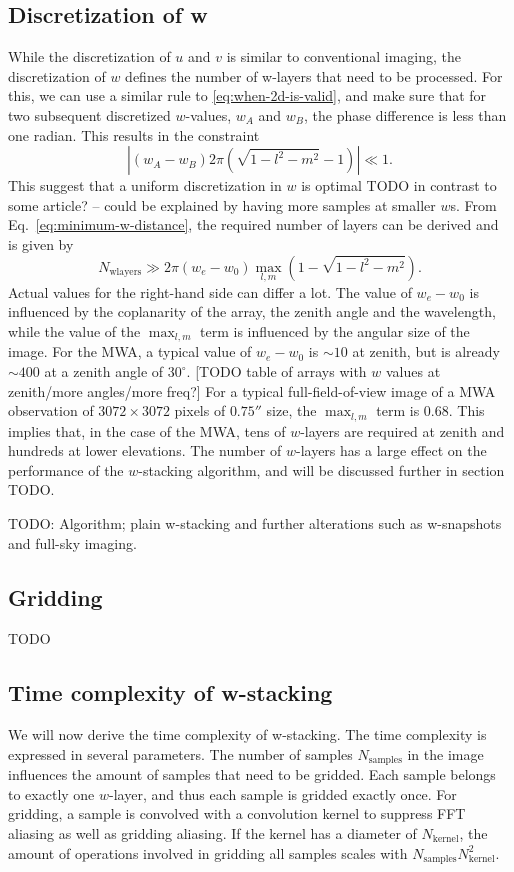 \documentclass[useAMS,usenatbib]{mn2e}
\begin{document}
\subsection{Discretization of w} \label{sec:gridding-w}
While the discretization of $u$ and $v$ is similar to conventional imaging, the discretization of $w$ defines the number of w-layers that need to be processed. For this, we can use a similar rule to \eqref{eq:when-2d-is-valid}, and make sure that for two subsequent discretized $w$-values, $w_A$ and $w_B$, the phase difference is less than one radian. This results in the constraint
\begin{equation} \label{eq:minimum-w-distance}
\left|\left(w_A - w_B\right) 2\pi (\sqrt{1-l^2-m^2}-1)\right| \ll 1.
\end{equation}
This suggest that a uniform discretization in $w$ is optimal TODO in contrast to some article? -- could be explained by having more samples at smaller $w$s. From Eq.~\eqref{eq:minimum-w-distance}, the required number of layers can be derived and is given by
\begin{equation}
 N_\textrm{wlayers} \gg 2\pi \left(w_e - w_0\right) \max_{l,m} \left(1 - \sqrt{1-l^2-m^2}\right).
\end{equation}
Actual values for the right-hand side can differ a lot. The value of $w_e - w_0$ is influenced by the coplanarity of the array, the zenith angle and the wavelength, while the value of the $\max_{l,m}$ term is influenced by the angular size of the image. For the MWA, a typical value of $w_e - w_0$ is $\sim 10$ at zenith, but is already $\sim 400$ at a zenith angle of $30^{\circ}$. [TODO table of arrays with $w$ values at zenith/more angles/more freq?] For a typical full-field-of-view image of a MWA observation of $3072\times 3072$ pixels of $0.75''$ size, the $\max_{l,m}$ term is $0.68$. This implies that, in the case of the MWA, tens of $w$-layers are required at zenith and hundreds at lower elevations. The number of $w$-layers has a large effect on the performance of the $w$-stacking algorithm, and will be discussed further in section TODO.

TODO: Algorithm; plain w-stacking and further alterations such as w-snapshots and full-sky imaging.
\subsection{Gridding}
TODO

\subsection{Time complexity of w-stacking}
We will now derive the time complexity of w-stacking. The time complexity is expressed in several parameters. The number of samples $N_\textrm{samples}$ in the image influences the amount of samples that need to be gridded. Each sample belongs to exactly one $w$-layer, and thus each sample is gridded exactly once. For gridding, a sample is convolved with a convolution kernel to suppress FFT aliasing as well as gridding aliasing. If the kernel has a diameter of $N_\textrm{kernel}$, the amount of operations involved in gridding all samples scales with $N_\textrm{samples}N^2_\textrm{kernel}$.
\end{document}
